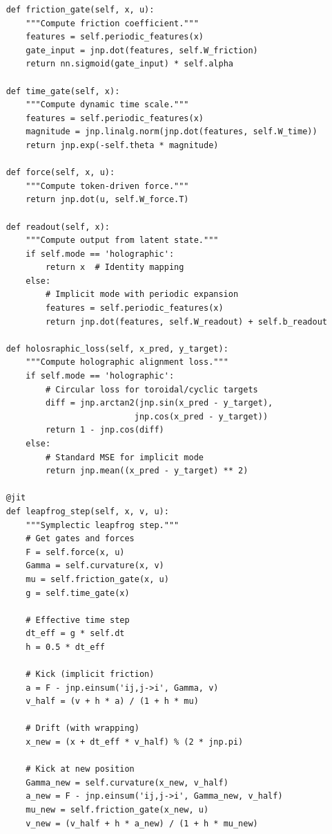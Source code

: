 \documentclass[12pt,letterpaper,twoside]{article}
\begin{document}
\begin{verbatim}
    def friction_gate(self, x, u):
        """Compute friction coefficient."""
        features = self.periodic_features(x)
        gate_input = jnp.dot(features, self.W_friction)
        return nn.sigmoid(gate_input) * self.alpha
    
    def time_gate(self, x):
        """Compute dynamic time scale."""
        features = self.periodic_features(x)
        magnitude = jnp.linalg.norm(jnp.dot(features, self.W_time))
        return jnp.exp(-self.theta * magnitude)
    
    def force(self, x, u):
        """Compute token-driven force."""
        return jnp.dot(u, self.W_force.T)
    
    def readout(self, x):
        """Compute output from latent state."""
        if self.mode == 'holographic':
            return x  # Identity mapping
        else:
            # Implicit mode with periodic expansion
            features = self.periodic_features(x)
            return jnp.dot(features, self.W_readout) + self.b_readout
    
    def holosraphic_loss(self, x_pred, y_target):
        """Compute holographic alignment loss."""
        if self.mode == 'holographic':
            # Circular loss for toroidal/cyclic targets
            diff = jnp.arctan2(jnp.sin(x_pred - y_target), 
                              jnp.cos(x_pred - y_target))
            return 1 - jnp.cos(diff)
        else:
            # Standard MSE for implicit mode
            return jnp.mean((x_pred - y_target) ** 2)
    
    @jit
    def leapfrog_step(self, x, v, u):
        """Symplectic leapfrog step."""
        # Get gates and forces
        F = self.force(x, u)
        Gamma = self.curvature(x, v)
        mu = self.friction_gate(x, u)
        g = self.time_gate(x)
        
        # Effective time step
        dt_eff = g * self.dt
        h = 0.5 * dt_eff
        
        # Kick (implicit friction)
        a = F - jnp.einsum('ij,j->i', Gamma, v)
        v_half = (v + h * a) / (1 + h * mu)
        
        # Drift (with wrapping)
        x_new = (x + dt_eff * v_half) % (2 * jnp.pi)
        
        # Kick at new position
        Gamma_new = self.curvature(x_new, v_half)
        a_new = F - jnp.einsum('ij,j->i', Gamma_new, v_half)
        mu_new = self.friction_gate(x_new, u)
        v_new = (v_half + h * a_new) / (1 + h * mu_new)
        

\end{verbatim}
\end{document}
